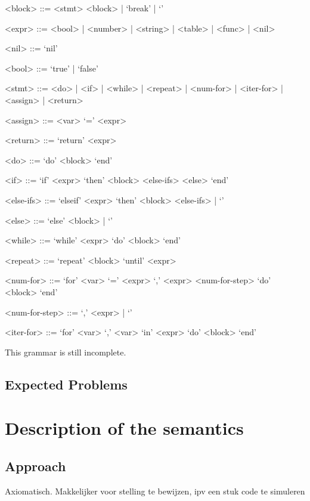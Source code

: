 \documentclass{article}
\begin{document}
\newpage

\begin{grammar}

	<block> ::= <stmt> <block> | `break' | `'

	<expr> ::= <bool> | <number> | <string> | <table> | <func> | <nil>

	<nil> ::= `nil'

	<bool> ::= `true' | `false'

	<stmt> ::= <do> | <if> | <while> | <repeat> | <num-for> | <iter-for> |
	<assign> | <return>

	<assign> ::= <var> `=' <expr>

	<return> ::= `return' <expr>

	<do> ::= `do' <block> `end'

	<if> ::= `if' <expr> `then' <block> <else-ifs> <else> `end'

	<else-ifs> ::= `elseif' <expr> `then' <block> <else-ifs> | `'

	<else> ::= `else' <block> | `'

	<while> ::= `while' <expr> `do' <block> `end'

	<repeat> ::= `repeat' <block> `until' <expr>

	<num-for> ::= `for' <var> `=' <expr> `,' <expr> <num-for-step> `do' <block>
	`end'

	<num-for-step> ::= `,' <expr> | `'

	<iter-for> ::= `for' <var> `,' <var> `in' <expr> `do' <block> `end'

\end{grammar}

This grammar is still incomplete.


\subsection{Expected Problems}

\section{Description of the semantics}
\subsection{Approach}
Axiomatisch. Makkelijker voor stelling te bewijzen, ipv een stuk code te simuleren
\end{document}
